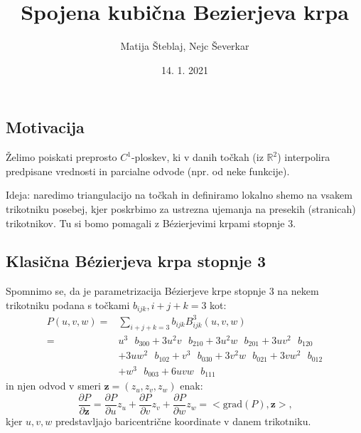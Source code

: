 \documentclass[ignorenonframetext]{beamer}
\title{Spojena kubična Bezierjeva krpa}
\author{Matija Šteblaj, Nejc Ševerkar}
\date{14. 1. 2021}
\let\frametitle\subsection %
\begin{document}
\begin{frame}
\titlepage
\end{frame}

\begin{frame}
\frametitle{Motivacija}
Želimo poiskati preprosto $C^1$-ploskev, ki v danih točkah (iz $\mathbb{R}^2$) interpolira predpisane vrednosti in parcialne odvode (npr. od neke funkcije).\vspace{10px}

Ideja: naredimo triangulacijo na točkah in definiramo lokalno shemo na vsakem trikotniku posebej, kjer poskrbimo za ustrezna ujemanja na presekih (stranicah) trikotnikov. Tu si bomo pomagali z Bézierjevimi krpami stopnje 3.
\end{frame}


\begin{frame}
\frametitle{Klasična  Bézierjeva krpa stopnje 3}
Spomnimo se, da je parametrizacija  Bézierjeve krpe stopnje 3 na nekem trikotniku podana s točkami $b_{ijk}, i+j+k=3$ kot:
\[
\begin{split}
	P(u,v,w) =& \sum_{i+j+k=3} b_{ijk} B_{ijk}^3(u,v,w) \\
		=& u^3 \text{ }b_{300} + 3u^2 v \text{ }b_{210} + 3u^2 w \text{ }b_{201} + 3u v^2 \text{ }b_{120} \\
		&+ 3uw^2 \text{ }b_{102} + v^3 \text{ }b_{030} + 3v^2 w \text{ }b_{021} + 3v w^2 \text{ }b_{012} \\
		&+ w^3 \text{ }b_{003} + 6uvw \text{ }b_{111}
\end{split}
\]
in njen odvod v smeri $\textbf{z} = (z_u,z_v,z_w)$ enak:
$$\frac{\partial{P}}{\partial{\textbf{z}}} = \frac{\partial{P}}{\partial{u}} z_u+ \frac{\partial{P}}{\partial{v}} z_v+ \frac{\partial{P}}{\partial{w}} z_w = <\text{grad}(P), \textbf{z}>\text{,}$$
kjer $u,v,w$ predstavljajo baricentrične koordinate v danem trikotniku.
\end{frame}
\end{document}
